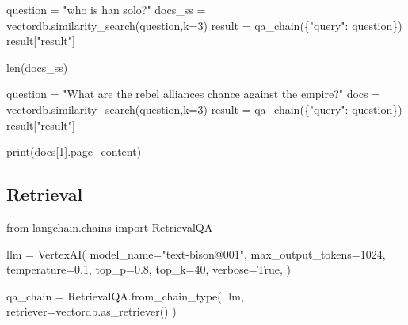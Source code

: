 \documentclass[
  letterpaper,
  DIV=11,
  numbers=noendperiod]{scrreprt}
\newenvironment{Shaded}{\begin{snugshade}}{\end{snugshade}}
\newcommand{\BuiltInTok}[1]{\textcolor[rgb]{0.00,0.23,0.31}{#1}}
\newcommand{\DecValTok}[1]{\textcolor[rgb]{0.68,0.00,0.00}{#1}}
\newcommand{\FloatTok}[1]{\textcolor[rgb]{0.68,0.00,0.00}{#1}}
\newcommand{\ImportTok}[1]{\textcolor[rgb]{0.00,0.46,0.62}{#1}}
\newcommand{\NormalTok}[1]{\textcolor[rgb]{0.00,0.23,0.31}{#1}}
\newcommand{\OperatorTok}[1]{\textcolor[rgb]{0.37,0.37,0.37}{#1}}
\newcommand{\StringTok}[1]{\textcolor[rgb]{0.13,0.47,0.30}{#1}}
\newcommand{\VariableTok}[1]{\textcolor[rgb]{0.07,0.07,0.07}{#1}}
\begin{document}
\begin{Shaded}
\begin{Highlighting}[]
\NormalTok{question }\OperatorTok{=} \StringTok{"who is han solo?"}
\NormalTok{docs\_ss }\OperatorTok{=}\NormalTok{ vectordb.similarity\_search(question,k}\OperatorTok{=}\DecValTok{3}\NormalTok{)}
\NormalTok{result }\OperatorTok{=}\NormalTok{ qa\_chain(\{}\StringTok{"query"}\NormalTok{: question\})}
\NormalTok{result[}\StringTok{"result"}\NormalTok{]}
\end{Highlighting}
\end{Shaded}

\begin{Shaded}
\begin{Highlighting}[]
\BuiltInTok{len}\NormalTok{(docs\_ss)}
\end{Highlighting}
\end{Shaded}

\begin{Shaded}
\begin{Highlighting}[]
\NormalTok{question }\OperatorTok{=} \StringTok{"What are the rebel alliance\textquotesingle{}s chance against the empire?"}
\NormalTok{docs }\OperatorTok{=}\NormalTok{ vectordb.similarity\_search(question,k}\OperatorTok{=}\DecValTok{3}\NormalTok{)}
\NormalTok{result }\OperatorTok{=}\NormalTok{ qa\_chain(\{}\StringTok{"query"}\NormalTok{: question\})}
\NormalTok{result[}\StringTok{"result"}\NormalTok{]}
\end{Highlighting}
\end{Shaded}

\begin{Shaded}
\begin{Highlighting}[]
\BuiltInTok{print}\NormalTok{(docs[}\DecValTok{1}\NormalTok{].page\_content)}
\end{Highlighting}
\end{Shaded}

\hypertarget{retrieval-1}{%
\subsection{Retrieval}\label{retrieval-1}}

\begin{Shaded}
\begin{Highlighting}[]
\ImportTok{from}\NormalTok{ langchain.chains }\ImportTok{import}\NormalTok{ RetrievalQA}

\NormalTok{llm }\OperatorTok{=}\NormalTok{ VertexAI(}
\NormalTok{    model\_name}\OperatorTok{=}\StringTok{"text{-}bison@001"}\NormalTok{,}
\NormalTok{    max\_output\_tokens}\OperatorTok{=}\DecValTok{1024}\NormalTok{,}
\NormalTok{    temperature}\OperatorTok{=}\FloatTok{0.1}\NormalTok{,}
\NormalTok{    top\_p}\OperatorTok{=}\FloatTok{0.8}\NormalTok{,}
\NormalTok{    top\_k}\OperatorTok{=}\DecValTok{40}\NormalTok{,}
\NormalTok{    verbose}\OperatorTok{=}\VariableTok{True}\NormalTok{,}
\NormalTok{)}

\NormalTok{qa\_chain }\OperatorTok{=}\NormalTok{ RetrievalQA.from\_chain\_type(}
\NormalTok{    llm,}
\NormalTok{    retriever}\OperatorTok{=}\NormalTok{vectordb.as\_retriever()}
\NormalTok{)}
\end{Highlighting}
\end{Shaded}
\end{document}
